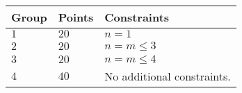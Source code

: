 \noindent
\begin{tabular}{| l | l | p{12cm} |}
  \hline
  \textbf{Group} & \textbf{Points} & \textbf{Constraints} \\ \hline
  $1$    & $20$      & $n = 1$ \\ \hline
  $2$    & $20$      & $n = m \leq 3$ \\ \hline
  $3$    & $20$      & $n = m \leq 4$ \\ \hline
  $4$   & $40$        & No additional constraints. \\ \hline
\end{tabular}